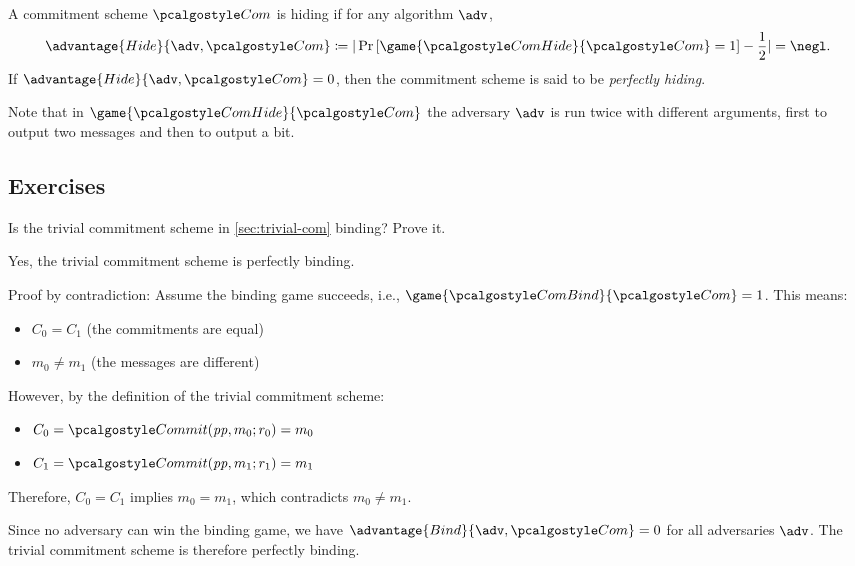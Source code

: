 \begin{definition}[Hiding]
  A commitment scheme $\algo{Com}$ is hiding if for any \ppt algorithm $\adv$,
 \[
  \advantage{Hide}{\adv, \algo{Com}} \defeq |\pr{\game{\algo{ComHide}}{\algo{Com}} = 1} - \frac{1}{2}| = \negl.
 \]
 If $\advantage{Hide}{\adv, \algo{Com}} = 0$, then the commitment scheme is said to be \emph{perfectly hiding}.
\end{definition}

Note that in $\game{\algo{ComHide}}{\algo{Com}}$ the adversary $\adv$ is run twice with different arguments, first to output two messages and then to output a bit.

\subsection{Exercises}

\begin{exercise}
  Is the trivial commitment scheme in \cref{sec:trivial-com} binding?
  Prove it.
\end{exercise}

\ifsolutions
\begin{mysolution}
  Yes, the trivial commitment scheme is perfectly binding.
  
  Proof by contradiction: Assume the binding game succeeds, i.e., $\game{\algo{ComBind}}{\algo{Com}} = 1$.
  This means:
  \begin{itemize}
    \item $C_0 = C_1$ (the commitments are equal)
    \item $m_0 \neq m_1$ (the messages are different)
  \end{itemize}
  
  However, by the definition of the trivial commitment scheme:
  \begin{itemize}
    \item $C_0 = \algo{Commit}(\params, m_0; r_0) = m_0$
    \item $C_1 = \algo{Commit}(\params, m_1; r_1) = m_1$
  \end{itemize}
  
  Therefore, $C_0 = C_1$ implies $m_0 = m_1$, which contradicts $m_0 \neq m_1$.
  
  Since no adversary can win the binding game, we have $\advantage{Bind}{\adv, \algo{Com}} = 0$ for all adversaries $\adv$.
  The trivial commitment scheme is therefore perfectly binding.
\end{mysolution}
\fi

